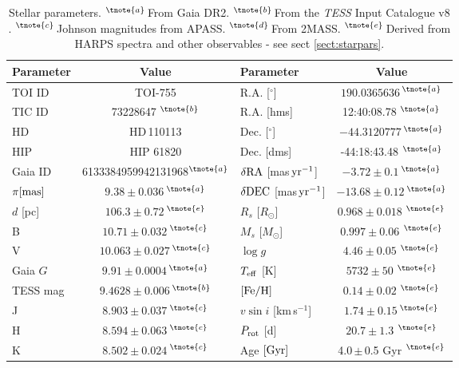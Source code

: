 \documentclass[fleqn,usenatbib]{mnras}
\newcommand{\tess}{{\it TESS}}
\newcommand{\harps}{{HARPS}}
\newcommand{\kms}{km\,s$^{-1}$}
\newcommand{\msun}{\mbox{$M_{\odot}$}}
\newcommand{\rsun}{\mbox{$R_{\odot}$}}
\newcommand{\vsini}{$v\sin{i}$}
\newcommand{\teff}{$T_{\rm eff}$}
\newcommand{\feh}{\mbox{$\rm [Fe/H]$}}
\newcommand{\logg}{$\log g$}
\newcommand{\Tlogg}{ $ 4.46 \pm 0.05 $ }
\newcommand{\TFeH}{ $ 0.14 \pm 0.02 $ }
\newcommand{\TTeff}{ $ 5732 \pm 50 $ }
\newcommand{\Tmstar}{ $ 0.997 \pm 0.06 $ }
\newcommand{\Trstar}{ $ 0.968 \pm 0.018 $ }
\newcommand{\Tperiod}{ $ 20.7 \pm 1.3 $ }
\newcommand{\TTstar}{TOI-755}
\newcommand{\Tstar}{HD\,110113}
\newcommand{\Tstarage}{4.0\,$\pm$\,0.5 Gyr}
\newcommand{\TGAIAid}{6133384959942131968}
\begin{document}
\begin{table}
    \centering
    \begin{tabular}{lc|lc}
        \hline
        \hline
        Parameter & Value & Parameter & Value \\
        \hline
        \hline
        TOI ID & \TTstar & R.A. [$^{\circ}$] & $190.0365636$\,$^{\tnote{a}}$ \\
        TIC ID & 73228647 $^{\tnote{b}}$ & R.A. [hms] & 12:40:08.78 $^{\tnote{a}}$ \\
        HD & \Tstar & Dec. [$^{\circ}$] & $-44.3120777$\,$^{\tnote{a}}$\\
        HIP & HIP 61820 & Dec. [dms] & -44:18:43.48 $^{\tnote{a}}$ \\
        Gaia ID & {\scriptsize \TGAIAid $^{\tnote{a}}$} & $\delta{\rm RA}$ [mas\,${\rm yr}^{-1}$] & $-3.72 \pm 0.1$\,$^{\tnote{a}}$ \\
        $\pi{} [{\rm mas}]$ & $9.38 \pm 0.036$\,$^{\tnote{a}}$ & $\delta{\rm DEC}$ [mas\,${\rm yr}^{-1}$] & $-13.68 \pm 0.12$\,$^{\tnote{a}}$ \\
        $d$ [pc] & $ 106.3\pm0.72$\,$^{\tnote{e}}$ & $R_s$ [\rsun{}] & \Trstar{}$^{\tnote{e}}$ \\
        B & $10.71\pm0.032$\,$^{\tnote{c}}$ & $M_s$ [\msun{}] & \Tmstar{}$^{\tnote{e}}$ \\
        V & $10.063\pm0.027$\,$^{\tnote{c}}$ &  \logg{} & \Tlogg{}$^{\tnote{e}}$ \\
        Gaia $G$ & $9.91\pm0.0004$\,$^{\tnote{a}}$ & \teff{} [K] & \TTeff{}$^{\tnote{e}}$ \\
        TESS mag & $9.4628\pm0.006$\,$^{\tnote{b}}$ & \feh{} & \TFeH{}$^{\tnote{e}}$ \\
        J & $8.903 \pm 0.037$\,$^{\tnote{c}}$ & \vsini{} [\kms{}]& $1.74\pm0.15$\,$^{\tnote{e}}$\\
        H & $8.594 \pm 0.063$\,$^{\tnote{c}}$ & $P_{\rm rot}$ [d] & \Tperiod{}$^{\tnote{e}}$\\
        K & $8.502 \pm0.024$\,$^{\tnote{c}}$ & Age $[{\rm Gyr}]$ & \Tstarage{} $^{\tnote{e}}$ \\
        \hline
        \hline
    \end{tabular}
    \caption{Stellar parameters.
    $^{\tnote{a}}$\,From Gaia DR2\citep{brown2018gaia}. $^{\tnote{b}}$\,From the \tess{} Input Catalogue v8 \citep{stassun2019revised}. $^{\tnote{c}}$\,Johnson magnitudes from APASS\citep{apass}. $^{\tnote{d}}$\,From 2MASS\citep{skrutskie2006two}. $^{\tnote{e}}$\,Derived from \harps{} spectra and other observables - see sect \ref{sect:starpars}.}
    \label{tab:starpars}
\end{table}
\end{document}
